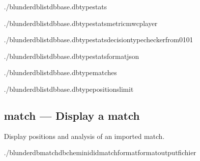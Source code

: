 \documentclass[letterpaper,10pt,english]{sphinxmanual}
\begin{document}
\begin{sphinxVerbatim}[commandchars=\\\{\}]
./blunderdblist\PYGZhy{}\PYGZhy{}dbbase.db\PYGZhy{}\PYGZhy{}typestats

./blunderdblist\PYGZhy{}\PYGZhy{}dbbase.db\PYGZhy{}\PYGZhy{}typestats\PYGZhy{}\PYGZhy{}metricmwc\PYGZhy{}\PYGZhy{}player

./blunderdblist\PYGZhy{}\PYGZhy{}dbbase.db\PYGZhy{}\PYGZhy{}typestats\PYGZhy{}\PYGZhy{}decision\PYGZhy{}typechecker\PYGZhy{}\PYGZhy{}from\PYGZhy{}01\PYGZhy{}01

./blunderdblist\PYGZhy{}\PYGZhy{}dbbase.db\PYGZhy{}\PYGZhy{}typestats\PYGZhy{}\PYGZhy{}formatjson

./blunderdblist\PYGZhy{}\PYGZhy{}dbbase.db\PYGZhy{}\PYGZhy{}typematches

./blunderdblist\PYGZhy{}\PYGZhy{}dbbase.db\PYGZhy{}\PYGZhy{}typepositions\PYGZhy{}\PYGZhy{}limit
\end{sphinxVerbatim}


\subsection{match — Display a match}
\label{\detokenize{cli:match-afficher-un-match}}
\sphinxAtStartPar
Display positions and analysis of an imported match.

\begin{sphinxVerbatim}[commandchars=\\\{\}]
./blunderdbmatch\PYGZhy{}\PYGZhy{}db\PYGZlt{}chemin\PYGZgt{}\PYGZhy{}\PYGZhy{}id\PYGZlt{}id\PYGZus{}match\PYGZgt{}\PYG{o}{[}\PYGZhy{}\PYGZhy{}format\PYGZlt{}format\PYGZgt{}\PYG{o}{]}\PYG{o}{[}\PYGZhy{}\PYGZhy{}output\PYGZlt{}fichier\PYGZgt{}\PYG{o}{]}
\end{sphinxVerbatim}
\end{document}
